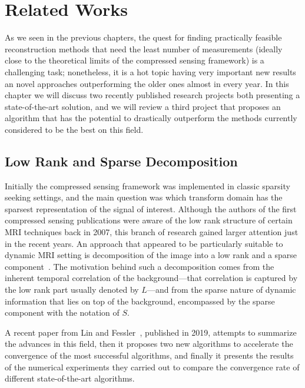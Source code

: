\chapter{Related Works}

As we seen in the previous chapters, the quest for finding practically feasible reconstruction methods that need the least number of measurements (ideally close to the theoretical limits of the compressed sensing framework) is a challenging task; nonetheless, it is a hot topic having very important new results an novel approaches outperforming the older ones almost in every year. In this chapter we will discuss two recently published research projects both presenting a state-of-the-art solution, and we will review a third project that proposes an algorithm that has the potential to drastically outperform the methods currently considered to be the best on this field.

\section{Low Rank and Sparse Decomposition}

Initially the compressed sensing framework was implemented in classic sparsity seeking settings, and the main question was which transform domain has the sparsest representation of the signal of interest. Although the authors of the first compressed sensing publications were aware of the low rank structure of certain MRI techniques back in 2007, this branch of research gained larger attention just in the recent years. An approach that appeared to be particularly suitable to dynamic MRI setting is decomposition of the image into a low rank and a sparse component~\cite{lingala_accelerated_2011, tremoulheac_dynamic_2014, otazo_lowrank_2015, roohi_multidimensional_2017}. The motivation behind such a decomposition comes from the inherent temporal correlation of the background---that correlation is captured by the low rank part usually denoted by $L$---and from the sparse nature of dynamic information that lies on top of the background, encompassed by the sparse component with the notation of $S$.

A recent paper from Lin and Fessler~\cite{lin_efficient_2019}, published in 2019, attempts to summarize the advances in this field, then it proposes two new algorithms to accelerate the convergence of the most successful algorithms, and finally it presents the results of the numerical experiments they carried out to compare the convergence rate of different state-of-the-art algorithms.  

